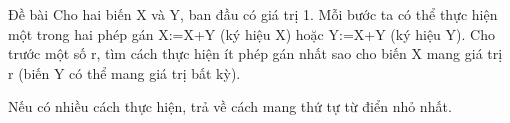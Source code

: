 Đề bài  
Cho hai biến X và Y, ban đầu có giá trị 1. Mỗi bước ta có thể thực hiện một trong hai phép gán X:=X+Y (ký hiệu X) hoặc Y:=X+Y (ký hiệu Y). Cho trước một số r, tìm cách thực hiện ít phép gán nhất sao cho biến X mang giá trị r (biến Y có thể mang giá trị bất kỳ).  

   Nếu có nhiều cách thực hiện, trả về cách mang thứ tự từ điển nhỏ nhất.